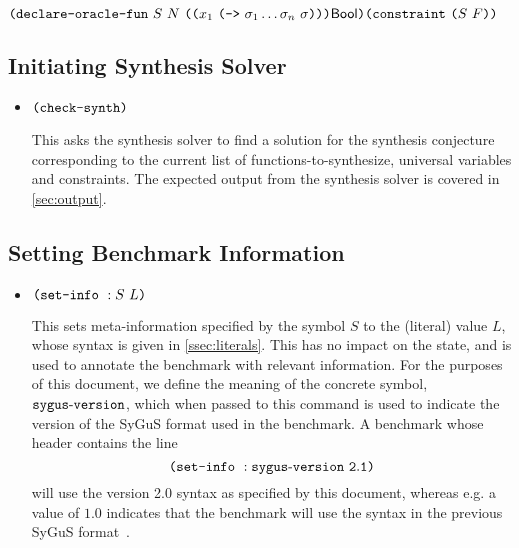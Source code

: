 \documentclass[english,a4paper,10pt]{article}
\begin{document}
\begin{itemize}
$
\paren{\oracledeckwd\mbox{ }S\mbox{ }N\mbox{ }\paren{\paren{
x_1\mbox{ }
\paren{
\funsortkwd \mbox{ } \sigma_1 \ldots \sigma_n\mbox{ }\sigma }}}
\sbool}\\
%
\paren{\constraintkwd \mbox{ } \paren{S \mbox{ } F}}
$






\end{itemize}	


\subsection{Initiating Synthesis Solver}

\begin{itemize}
\item $\texttt{(}\texttt{check-synth}\texttt{)}$

This asks the synthesis solver to find a solution for the synthesis conjecture
corresponding to the current list of functions-to-synthesize,
universal variables and constraints.
The expected output
from the synthesis solver is covered in \cref{sec:output}.
\end{itemize}

\subsection{Setting Benchmark Information}

\begin{itemize}
\item $\texttt{(}\texttt{set-info}\mbox{ }:S\mbox{ }L\texttt{)}$

This sets meta-information specified by the symbol $S$
to the (literal) value $L$, whose syntax is given in \cref{ssec:literals}.
This has no impact on the state, and is used to annotate the
benchmark with relevant information.
For the purposes of this document, we define the meaning of
the concrete symbol, ${\tt sygus\mbox{-}version}$,
which when passed to this command is used to indicate the version of the SyGuS
format used in the benchmark.
A benchmark whose header contains the line
\[
\texttt{(}\texttt{set-info}\mbox{ }:{\tt sygus\mbox{-}version\mbox{ }2.1}\texttt{)}
\]
will use the version 2.0 syntax as specified by this document,
whereas e.g. a value of $1.0$ indicates that the benchmark will use the
syntax in the previous SyGuS format~\cite{sygusFormat,sygusSyntax2015,sygusSyntax2016}.
\end{itemize}
\end{document}
